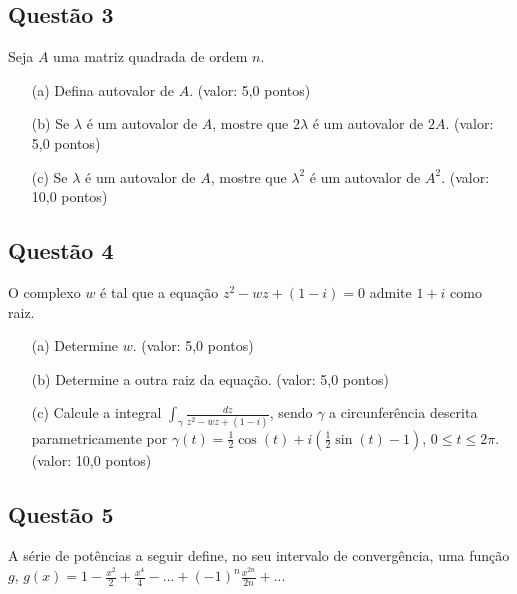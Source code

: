 \documentclass{report}
\begin{document}
\subsection{\color{blue} Quest\~ao 3}

Seja $A$ uma matriz quadrada de ordem $n$.

\begin{enumerate}

\item[(a)] Defina autovalor de $A$. (valor: 5,0 pontos)

\item[(b)] Se $\lambda$ \'e um autovalor de $A$, mostre que $2\lambda$ \'e um autovalor de $2A$. (valor: 5,0 pontos)

\item[(c)] Se $\lambda$ \'e um autovalor de $A$, mostre que $\lambda ^2$ \'e um autovalor de $A^2$. (valor: 10,0 pontos)

\end{enumerate}

\subsection{\color{blue} Quest\~ao 4}

O complexo $w$ \'e tal que a equa\c c\~ao $z^2-wz+(1-i)=0$ admite $1+i$ como raiz. 

\begin{enumerate}

\item[(a)] Determine $w$. (valor: 5,0 pontos)

\item[(b)] Determine a outra raiz da equa\c c\~ao. (valor: 5,0 pontos)

\item[(c)] Calcule a integral $\displaystyle \int_\gamma \frac{dz}{z^2-wz+(1-i)}$, sendo $\gamma$ a circunfer\^encia descrita parametricamente por $\gamma(t)=\frac1{2} \cos(t)+i(\frac1{2}\sin(t)-1)$, $0\leq t \leq 2\pi$. (valor: 10,0 pontos)

\end{enumerate}

\subsection{\color{blue} Quest\~ao 5}

A s\'erie de pot\^encias a seguir define, no seu intervalo de converg\^encia, uma fun\c c\~ao $g$, $g(x) =\displaystyle 1-\frac{x^2}{2}+\frac{x^4}{4}-...+(-1)^n\frac{x^{2n}}{2n}+...$
\end{document}
